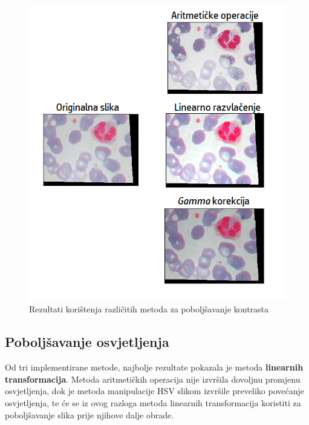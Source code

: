 \documentclass[12pt,a4paper]{article}
\begin{document}
\begin{figure}[H]

\center
\includegraphics[scale=0.9]{slikaKontrast.png}
\caption{Rezultati korištenja različitih metoda za poboljšavanje kontrasta}
	
\end{figure}

\newpage

\subsection{Poboljšavanje osvjetljenja}

Od tri implementirane metode, najbolje rezultate pokazala je metoda \textbf{linearnih transformacija}. Metoda aritmetičkih operacija nije izvršila dovoljnu promjenu osvjetljenja, dok je metoda manipulacije HSV slikom izvršile preveliko povećanje osvjetljenja, te će se iz ovog razloga metoda linearnih transformacija koristiti za poboljšavanje slika prije njihove dalje obrade.
\end{document}
